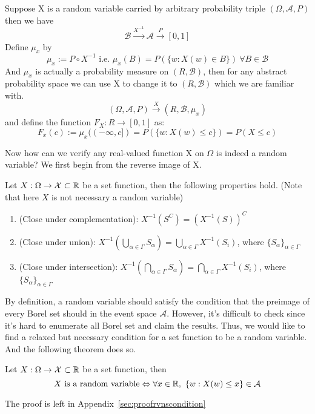 \documentclass[../Probability_Theory.tex]{subfiles}
\begin{document}
\begin{intuition}
Suppose X is a random variable carried by arbitrary probability triple $(\Omega,\mathcal{A},P)$ then we have $$\mathcal{B}\xrightarrow{X^{-1}} \mathcal{A} \xrightarrow{P} [0,1]$$
Define $\mu_x$ by 
$$\mu_x:=P\circ X^{-1} \text{  i.e.  } \mu_x(B)=P(\{w:X(w)\in B\})\  \forall B\in \mathcal{B}$$
And $\mu_x$ is actually a probability measure on $(R,\mathcal{B})$, then for any abstract probability space we can use X to change it to $(R,\mathcal{B})$ which we are familiar with. 
$$(\Omega,\mathcal{A},P)\xrightarrow{X} (R,\mathcal{B},\mu_x)$$ and define the function $F_X:R\rightarrow [0,1]$ as: 
$$F_x(c):=\mu_x((-\infty,c])=P(\{w:X(w)\leq c\})=P(X\leq c)$$
\end{intuition}
Now how can we verify any real-valued function X on $\Omega$ is indeed a random variable? We first begin from the reverse image of X. 
\begin{property}\label{propertyofsetfuncs}
	Let $X:\Omega\rightarrow\mathcal{X}\subset{\mathbb R}$ be a set function, then the following properties hold. (Note that here $X$ is not necessary a random variable)
	\begin{enumerate}
		\item (Close under complementation): $X^{-1}(S^C) = (X^{-1}(S))^C$
		\item (Close under union): $X^{-1}(\bigcup_{\alpha\in\Gamma}S_{\alpha}) = \bigcup_{\alpha\in\Gamma}X^{-1}(S_i)$, where $\{S_{\alpha}\}_{\alpha\in\Gamma}$
		\item (Close under intersection): $X^{-1}(\bigcap_{\alpha\in\Gamma}S_{\alpha}) = \bigcap_{\alpha\in\Gamma}X^{-1}(S_i)$, where $\{S_{\alpha}\}_{\alpha\in\Gamma}$
	\end{enumerate}
\end{property}

By definition, a random variable should satisfy the condition that the preimage of every Borel set should in the event space $\mathcal{A}$. However, it's difficult to check since it's hard to enumerate all Borel set and claim the results. Thus, we would like to find a relaxed but necessary condition for a set function to be a random variable. And the following theorem does so.

\begin{theorem}\label{rvnscondition}
	Let $X:\Omega\rightarrow\mathcal{X}\subset{\mathbb R}$ be a set function, then
	$$X\mbox{ is a random variable}\Leftrightarrow \forall x\in{\mathbb R},\ \{w:X(w)\leq x\}\in\mathcal{A}$$
\end{theorem}
The proof is left in Appendix~\ref{sec:proofrvnscondition}
\end{document}
